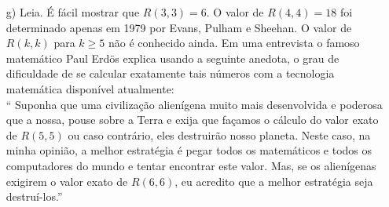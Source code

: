 \begin{enumerate}[leftmargin=*]
\begin{itemize}
		\item[g)] Leia. É fácil mostrar que $R(3,3)=6$. 
		O valor de $R(4,4)=18$ foi determinado apenas em 1979 
		por 	Evans, Pulham e Sheehan. 
		O valor de $R(k,k)$ para $k\geq 5$ não é conhecido ainda.
		Em uma entrevista o famoso matemático Paul Erdös 
		explica usando a seguinte anedota,
		o grau de dificuldade de se calcular exatamente
		tais números com a tecnologia matemática disponível atualmente: \\
		`` Suponha que uma civilização alienígena muito 
		mais desenvolvida e poderosa que a nossa, 
		pouse sobre a Terra e exija que façamos o cálculo do valor
		exato de $R(5,5)$ ou caso contrário, eles destruirão nosso planeta. 
		Neste caso, 
		na minha opinião, a melhor estratégia é pegar todos os matemáticos e todos
		os computadores do mundo e tentar encontrar este valor.
		Mas, se os alienígenas exigirem o valor exato de $R(6,6)$,
		eu acredito que 	a melhor estratégia seja destruí-los.''
		 
	\end{itemize}























\end{enumerate}